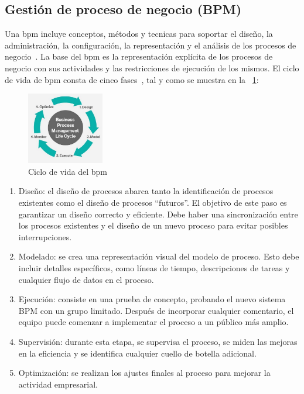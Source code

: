 \subsection{Gestión de proceso de negocio (BPM)}

Una \acrshort{bpm} incluye conceptos, métodos y tecnicas para soportar el diseño, la administración, la configuración, la representación y el análisis de los procesos de negocio~\cite{Weske}.
La base del \acrshort{bpm} es la representación explícita de los procesos de negocio con sus actividades y las restricciones de ejecución de los mismos.
El ciclo de vida de \acrshort{bpm} consta de cinco fases~\cite{bpmLifecycle}, tal y como se muestra en la \figurename~\ref{fig:lifecycle-bpm}:

\begin{figure}[hp!]
  \centering
  \includegraphics[width=0.30\textwidth]{imaxes/bpm-lifecycle.png}
  \caption{Ciclo de vida del \acrshort{bpm}}
  \label{fig:lifecycle-bpm}
\end{figure}

\begin{enumerate}
\item Diseño: el diseño de procesos abarca tanto la identificación de procesos existentes como el diseño de procesos ``futuros''. El objetivo de este paso es garantizar un diseño correcto y eficiente. Debe haber una sincronización entre los procesos existentes y el diseño de un nuevo proceso para evitar posibles interrupciones.
\item Modelado: se crea una representación visual del modelo de proceso. Esto debe incluir detalles específicos, como líneas de tiempo, descripciones de tareas y cualquier flujo de datos en el proceso. 
\item Ejecución: consiste en una prueba de concepto, probando el nuevo sistema BPM con un grupo limitado. Después de incorporar cualquier comentario, el equipo puede comenzar a implementar el proceso a un público más amplio.
\item Supervisión:  durante esta etapa, se supervisa el proceso, se miden las mejoras en la eficiencia y se identifica cualquier cuello de botella adicional.
\item Optimización: se realizan los ajustes finales al proceso para mejorar la actividad empresarial.
\end{enumerate}

